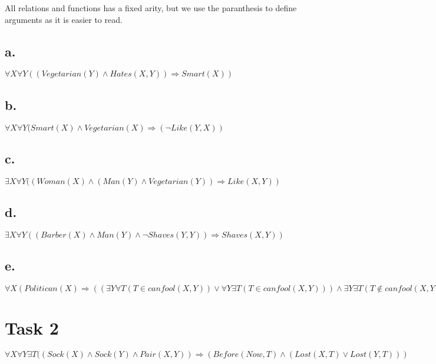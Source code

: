\documentclass[a4paper, english, 11pt]{article}
\begin{document}
All relations and functions has a fixed arity, but we use the paranthesis to define arguments as it is easier to read.

\subsection*{a.}

$\forall X \forall Y ((Vegetarian(Y) \wedge  Hates(X, Y)) \Rightarrow Smart(X))$

\subsection*{b.}

$\forall X \forall Y (Smart(X) \wedge Vegetarian(X) \Rightarrow (\neg Like(Y, X))$

\subsection*{c.}

$\exists X \forall Y ((Woman(X) \wedge (Man(Y) \wedge Vegetarian(Y)) \Rightarrow Like(X, Y))$

\subsection*{d.}

$\exists X \forall Y ((Barber(X) \wedge Man(Y) \wedge \neg Shaves(Y, Y)) \Rightarrow Shaves(X, Y))$

\subsection*{e.}

$\forall X(Politican(X) \Rightarrow ((\exists Y \forall T (T \in canfool(X, Y)) \vee \forall Y \exists T (T \in canfool(X, Y))) \wedge \exists Y \exists T (T \not\in canfool(X, Y))))$

\section*{Task 2}

$\forall X \forall Y \exists T ((Sock(X) \wedge Sock(Y) \wedge Pair(X, Y)) \Rightarrow (Before(Now, T) \wedge (Lost(X, T) \vee Lost(Y, T)))$
\end{document}
